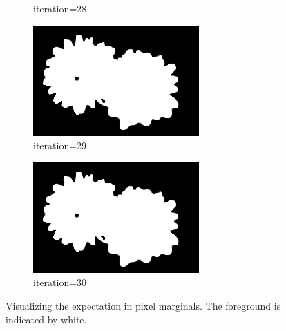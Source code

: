 \documentclass{article}
\begin{document}
\begin{figure}[t]
\begin{subfigure}[t]{0.19\textwidth}
\vspace{-0.6cm}
\caption{iteration=28}
\end{subfigure}
\begin{subfigure}[t]{0.19\textwidth}
\centering
\includegraphics[width=\textwidth]{./images/marginals_iter_29.png}
\vspace{-0.6cm}
\caption{iteration=29}
\end{subfigure}
\begin{subfigure}[t]{0.19\textwidth}
\centering
\includegraphics[width=\textwidth]{./images/marginals_iter_30.png}
\vspace{-0.6cm}
\caption{iteration=30}
\end{subfigure}

%
\caption{Visualizing the expectation in pixel marginals. The foreground is indicated by white.}
\label{f:52d}
\end{figure}
\end{document}
